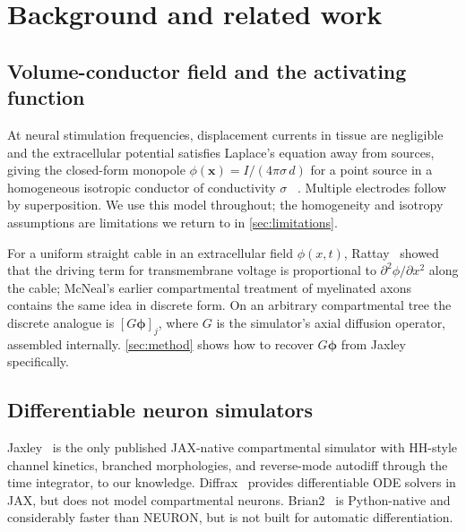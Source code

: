 \section{Background and related work}\label{sec:background}

\subsection{Volume-conductor field and the activating function}

At neural stimulation frequencies, displacement currents in tissue are
negligible and the extracellular potential satisfies Laplace's equation
away from sources, giving the closed-form monopole
$\phi(\mathbf{x}) = I / (4\pi\sigma\,d)$ for a point source in a
homogeneous isotropic conductor of conductivity $\sigma$~%
\cite{10.1093/acprof:oso/9780195058239.001.0001,10.1093/acprof:oso/9780195050387.001.0001}.
Multiple electrodes follow by superposition. We use this model
throughout; the homogeneity and isotropy assumptions are limitations we
return to in \cref{sec:limitations}.

For a uniform straight cable in an extracellular field $\phi(x,t)$,
Rattay~\cite{rattay1986analysis} showed that the driving term for
transmembrane voltage is proportional to $\partial^2 \phi / \partial
x^2$ along the cable; McNeal's earlier compartmental treatment of
myelinated axons~\cite{Mcneal1976AnalysisOA} contains the same idea in
discrete form. On an arbitrary compartmental tree the discrete analogue
is $[G\boldsymbol{\phi}]_j$, where $G$ is the simulator's axial
diffusion operator, assembled internally. \cref{sec:method} shows how
to recover $G\boldsymbol{\phi}$ from Jaxley specifically.

\subsection{Differentiable neuron simulators}

Jaxley~\cite{deistler2025jaxley} is the only published JAX-native
compartmental simulator with HH-style channel kinetics, branched
morphologies, and reverse-mode autodiff through the time integrator,
to our knowledge.
Diffrax~\cite{DBLP:journals/corr/abs-2202-02435} provides
differentiable ODE solvers in JAX, but does not model compartmental
neurons. Brian2~\cite{Stimberg2019} is Python-native and considerably
faster than NEURON, but is not built for automatic differentiation.

